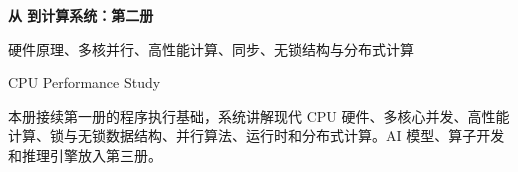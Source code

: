 \begin{titlepage}
\thispagestyle{empty}
\vspace*{2.2cm}
{\Huge\bfseries\color{BookNavy} 从 \cpp 到计算系统：第二册\par}
\vspace{0.68cm}
{\Large\color{BookAccent} 硬件原理、多核并行、高性能计算、同步、无锁结构与分布式计算\par}
\vspace{1.25cm}
{\large CPU Performance Study\par}
\vfill
{\small\color{BookMuted} 本册接续第一册的程序执行基础，系统讲解现代 CPU 硬件、多核心并发、高性能计算、锁与无锁数据结构、并行算法、运行时和分布式计算。AI 模型、算子开发和推理引擎放入第三册。\par}
\end{titlepage}
